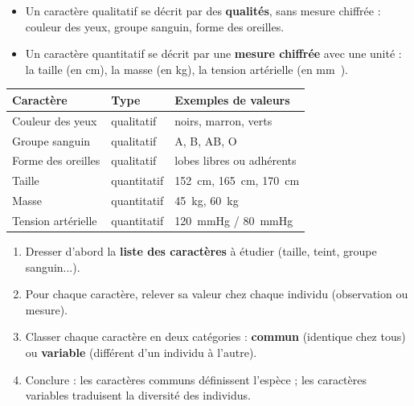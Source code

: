 \documentclass[11pt]{article}
\newcommand{\cle}[1]{{\popxbold\color{popdark}#1}}
\begin{document}
\begin{definition}
\begin{itemize}
\item Un caractère \cle{qualitatif} se décrit par des \textbf{qualités}, sans mesure chiffrée : couleur des yeux, groupe sanguin, forme des oreilles.
\item Un caractère \cle{quantitatif} se décrit par une \textbf{mesure chiffrée} avec une unité : la taille (en \si{\centi\meter}), la masse (en \si{\kilo\gram}), la tension artérielle (en \si{\milli\meter{}}).
\end{itemize}
\end{definition}

\begin{exemplebox}
\begin{center}
\begin{tabularx}{\linewidth}{|l|X|X|}
\hline
\rowcolor{popblueL} \textbf{Caractère} & \textbf{Type} & \textbf{Exemples de valeurs} \\
\hline
Couleur des yeux & qualitatif & noirs, marron, verts \\
\hline
Groupe sanguin & qualitatif & A, B, AB, O \\
\hline
Forme des oreilles & qualitatif & lobes libres ou adhérents \\
\hline
Taille & quantitatif & \SI{152}{cm}, \SI{165}{cm}, \SI{170}{cm} \\
\hline
Masse & quantitatif & \SI{45}{kg}, \SI{60}{kg} \\
\hline
Tension artérielle & quantitatif & \SI{120}{mmHg} / \SI{80}{mmHg} \\
\hline
\end{tabularx}
\end{center}
\end{exemplebox}

\begin{methode}
\begin{enumerate}
\item Dresser d'abord la \textbf{liste des caractères} à étudier (taille, teint, groupe sanguin...).
\item Pour chaque caractère, relever sa valeur chez chaque individu (observation ou mesure).
\item Classer chaque caractère en deux catégories : \textbf{commun} (identique chez tous) ou \textbf{variable} (différent d'un individu à l'autre).
\item Conclure : les caractères communs définissent l'espèce ; les caractères variables traduisent la diversité des individus.
\end{enumerate}
\end{methode}
\end{document}
